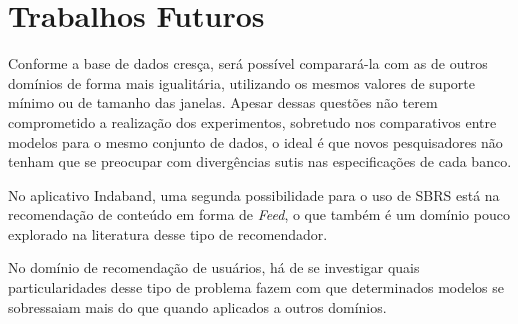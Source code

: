 \section{Trabalhos Futuros}
Conforme a base de dados cresça, será possível comparará-la com as de outros
domínios de forma mais igualitária, utilizando os mesmos valores de suporte
mínimo ou de tamanho das janelas. Apesar dessas questões não terem comprometido
a realização dos experimentos, sobretudo nos comparativos entre modelos para
o mesmo conjunto de dados, o ideal é que novos pesquisadores não tenham que
se preocupar com divergências sutis nas especificações de cada banco.

No aplicativo Indaband, uma segunda possibilidade para o uso de SBRS
está na recomendação de conteúdo em forma de \textit{Feed}, o que também
é um domínio pouco explorado na literatura desse tipo de recomendador.

No domínio de recomendação de usuários, há de se investigar quais
particularidades desse tipo de problema fazem com que determinados modelos
se sobressaiam mais do que quando aplicados a outros domínios.